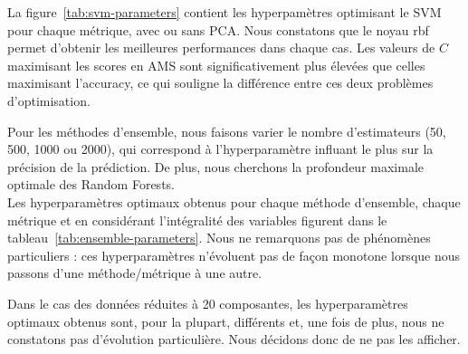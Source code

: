 \documentclass[12pt]{article}
\newcommand{\figref}[1]{figure~\ref{#1}}
\newcommand{\tabref}[1]{tableau~\ref{#1}}
\begin{document}
La \figref{tab:svm-parameters} contient les hyperpamètres optimisant le SVM pour
chaque métrique, avec ou sans PCA. Nous constatons que le noyau rbf permet
d'obtenir les meilleures performances dans chaque cas. Les valeurs de $C$
maximisant les scores en AMS sont significativement plus élevées que celles
maximisant l'accuracy, ce qui souligne la différence entre ces deux problèmes
d'optimisation.\\


\begin{table}[H]
    \centering
    \caption{Paramètres optimaux pour le SVM}
    \label{tab:svm-parameters}
\end{table}

Pour les méthodes d'ensemble, nous faisons varier le nombre d'estimateurs (50,
500, 1000 ou 2000), qui correspond à l'hyperparamètre influant le plus sur la
précision de la prédiction. De plus, nous cherchons la profondeur maximale
optimale des Random Forests.  \\

Les hyperparamètres optimaux obtenus pour chaque méthode d'ensemble, chaque
métrique et en considérant l'intégralité des variables figurent dans le
\tabref{tab:ensemble-parameters}. Nous ne remarquons pas de phénomènes
particuliers : ces hyperparamètres n'évoluent pas de façon monotone lorsque nous
passons d'une méthode/métrique à une autre.
\begin{mdframed}[hidealllines=true,backgroundcolor=blue!20] Dans le cas des
    données réduites à 20 composantes, les hyperparamètres optimaux obtenus
    sont, pour la plupart, différents et, une fois de plus, nous ne constatons
pas d'évolution particulière. Nous décidons donc de ne pas les afficher. \\
\end{mdframed}
\end{document}
